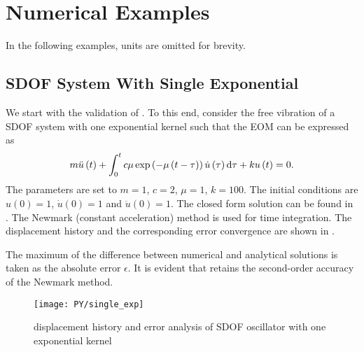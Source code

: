\section{Numerical Examples}
In the following examples, units are omitted for brevity.
\subsection{SDOF System With Single Exponential}
We start with the validation of . To this end, consider the free vibration of a SDOF system with one exponential kernel such that the EOM can be expressed as
\begin{gather}
m\ddot{u}\left(t\right)+\int_0^tc\mu\exp\left(-\mu\left(t-\tau\right)\right)\dot{u}\left(\tau\right)\mathrm{d}\tau+ku\left(t\right)=0.
\end{gather}
The parameters are set to $m=1$, $c=2$, $\mu=1$, $k=100$.
The initial conditions are $u\left(0\right)=1$, $\dot{u}\left(0\right)=1$ and $\ddot{u}\left(0\right)=1$.
The closed form solution can be found in .
The Newmark (constant acceleration) method is used for time integration.
The displacement history and the corresponding error convergence are shown in .

The maximum of the difference between numerical and analytical solutions is taken as the absolute error $\epsilon$. It is evident that  retains the second-order accuracy of the Newmark method.
\begin{figure}[H]
\centering
\texttt{[image: PY/single\_exp]}
\caption{displacement history and error analysis of SDOF oscillator with one exponential kernel}\label{fig:sdof}
\end{figure}
